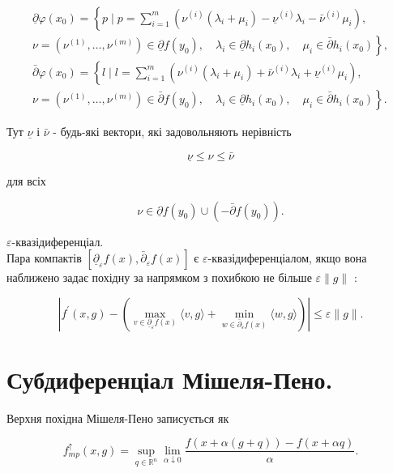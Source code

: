 \documentclass[10pt]{article}
\begin{document}
$$
\begin{array}{r}
\underline{\partial} \varphi\left(x_{0}\right)=\left\{p \mid p=\sum_{i=1}^{m}\left(\nu^{(i)}\left(\lambda_{i}+\mu_{i}\right)-\underline{\nu}^{(i)} \lambda_{i}-\bar{\nu}^{(i)} \mu_{i}\right),\right. \\
\left.\nu=\left(\nu^{(1)}, \ldots, \nu^{(m)}\right) \in \underline{\partial} f\left(y_{0}\right), \quad \lambda_{i} \in \underline{\partial} h_{i}\left(x_{0}\right), \quad \mu_{i} \in \bar{\partial} h_{i}\left(x_{0}\right)\right\}, \\
\bar{\partial} \varphi\left(x_{0}\right)=\left\{l \mid l=\sum_{i=1}^{m}\left(\nu^{(i)}\left(\lambda_{i}+\mu_{i}\right)+\bar{\nu}^{(i)} \lambda_{i}+\underline{\nu}^{(i)} \mu_{i}\right),\right. \\
\left.\nu=\left(\nu^{(1)}, \ldots, \nu^{(m)}\right) \in \bar{\partial} f\left(y_{0}\right), \quad \lambda_{i} \in \underline{\partial} h_{i}\left(x_{0}\right), \quad \mu_{i} \in \bar{\partial} h_{i}\left(x_{0}\right)\right\} .
\end{array}
$$

Тут $\underline{\nu}$ і $\bar{\nu}$ - будь-які вектори, які задовольняють нерівність

$$
\underline{\nu} \leq \nu \leq \bar{\nu}
$$

для всіх

$$
\nu \in \underline{\partial} f\left(y_{0}\right) \cup\left(-\bar{\partial} f\left(y_{0}\right)\right) .
$$

$\varepsilon$-квазідиференціал.\\
Пара компактів $\left[\underline{\partial}_{\varepsilon} f(x), \bar{\partial}_{\varepsilon} f(x)\right]$ є $\varepsilon$-квазідиференціалом, якщо вона наближено задає похідну за напрямком з похибкою не більше $\varepsilon\|g\|$ :

$$
\left|f^{\prime}(x, g)-\left(\max _{v \in \underline{\partial}_{\varepsilon} f(x)}\langle v, g\rangle+\min _{w \in \bar{\partial}_{\varepsilon} f(x)}\langle w, g\rangle\right)\right| \leq \varepsilon\|g\| .
$$

\section*{Субдиференціал Мішеля-Пено.}
Верхня похідна Мішеля-Пено записується як

$$
f_{m p}^{\uparrow}(x, g)=\sup _{q \in \mathbb{R}^{n}} \lim _{\alpha \downarrow 0} \frac{f(x+\alpha(g+q))-f(x+\alpha q)}{\alpha} .
$$
\end{document}
